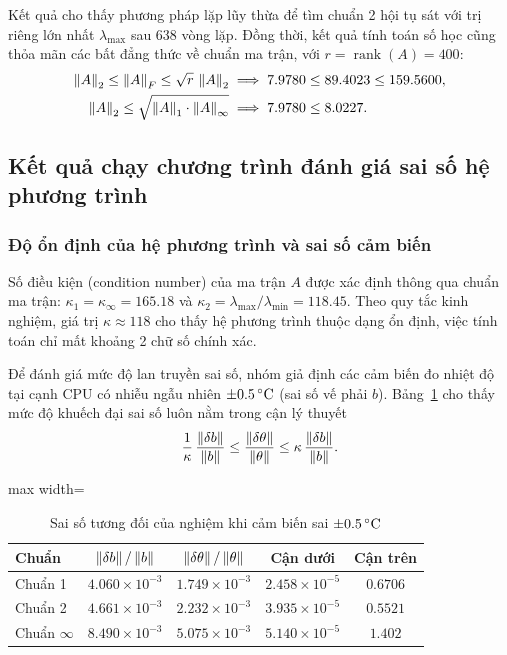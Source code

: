 Kết quả cho thấy phương pháp lặp lũy thừa để tìm chuẩn 2 hội tụ sát với trị riêng lớn nhất $\lambda_{\max}$ sau 638 vòng lặp.
Đồng thời, kết quả tính toán số học cũng thỏa mãn các bất đẳng thức về chuẩn ma trận, với $r = \operatorname{rank}(A) = 400$:
\begin{align*}
\left\lVert A \right\rVert_2 \le \left\lVert A \right\rVert_F \le \sqrt{r}\,\left\lVert A \right\rVert_2 &\implies 7.9780 \le 89.4023 \le 159.5600,\\
\left\lVert A \right\rVert_2 \le \sqrt{\left\lVert A \right\rVert_1 \cdot \left\lVert A \right\rVert_\infty} &\implies 7.9780 \le 8.0227.
\end{align*}

\subsection{Kết quả chạy chương trình đánh giá sai số hệ phương trình}

\subsubsection{Độ ổn định của hệ phương trình và sai số cảm biến}

Số điều kiện (condition number) của ma trận $A$ được xác định thông qua chuẩn ma trận: $\kappa_1 = \kappa_\infty = 165.18$
và $\kappa_2 = \lambda_{\max}/\lambda_{\min} = 118.45$. Theo quy tắc kinh nghiệm, giá trị $\kappa \approx 118$ cho thấy
hệ phương trình thuộc dạng ổn định, việc tính toán chỉ mất khoảng 2 chữ số chính xác.

Để đánh giá mức độ lan truyền sai số, nhóm giả định các cảm biến đo nhiệt độ tại cạnh CPU có nhiễu ngẫu nhiên
$\pm 0.5\,^{\circ}\mathrm{C}$ (sai số vế phải $b$). Bảng~\ref{tab:camBien} cho thấy mức độ khuếch đại sai số luôn nằm trong cận lý thuyết
\[
\frac{1}{\kappa}\,\frac{\left\lVert \delta b \right\rVert}{\left\lVert b \right\rVert} \le \frac{\left\lVert \delta\theta \right\rVert}{\left\lVert \theta \right\rVert} \le \kappa\,\frac{\left\lVert \delta b \right\rVert}{\left\lVert b \right\rVert}.
\]

\begin{table}[H]
\centering
\caption{Sai số tương đối của nghiệm khi cảm biến sai $\pm 0.5\,^{\circ}\mathrm{C}$}
\label{tab:camBien}
\begin{adjustbox}{max width=\textwidth}
\begin{tabular}{lcccc}
\toprule
Chuẩn & $\left\lVert \delta b \right\rVert/\left\lVert b \right\rVert$ & $\left\lVert \delta\theta \right\rVert/\left\lVert \theta \right\rVert$ & Cận dưới & Cận trên \\
\midrule
Chuẩn 1 & $4.060\times 10^{-3}$ & $1.749\times 10^{-3}$ & $2.458\times 10^{-5}$ & $0.6706$ \\
Chuẩn 2 & $4.661\times 10^{-3}$ & $2.232\times 10^{-3}$ & $3.935\times 10^{-5}$ & $0.5521$ \\
Chuẩn $\infty$ & $8.490\times 10^{-3}$ & $5.075\times 10^{-3}$ & $5.140\times 10^{-5}$ & $1.402$ \\
\bottomrule
\end{tabular}
\end{adjustbox}
\end{table}

